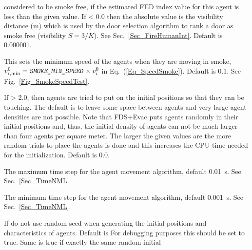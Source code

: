 \documentclass[12pt,a4paper,final,twoside]{stylevk}
\begin{document}
\begin{description}
  considered to be smoke free, if the estimated FED index value for
  this agent is less than the given value.  If < 0.0 then the absolute
  value is the visibility distance (m) which is used by the door
  selection algorithm to rank a door as smoke free (visibility $S =
  3/K$). See Sec.~\ref{Sec_FireHumanInt}.  Default is 0.000001.
%
\item[\Timts{SMOKE\_MIN\_SPEED}] This sets the minimum speed of the
  agents when they are moving in smoke, $v^0_{i,\mathrm{min}} =
  \textnormal{\texttt{\textsl{SMOKE\_MIN\_SPEED}}} \times v^0_i$ in Eq.~(\ref{Eq_SpeedSmoke}).
  Default is 0.1.  See Fig.~\ref{Fig_SmokeSpeedTest}.
%
%
\item[\Timts{DENS\_INIT}] If > 2.0, then agents are tried to put on
  the initial positions so that they can be touching.  The default is
  to leave some space between agents and very large agent densities
  are not possible.  Note that FDS+Evac puts agents randomly in their
  initial positions and, thus, the initial density of agents can not
  be much larger than four agents per square meter.  The larger the
  given values are the more random trials to place the agents is done
  and this increases the CPU time needed for the initialization.
  Default is 0.0.
%
\item[\Timts{EVAC\_DT\_MAX}] The maximum time step for the agent
  movement algorithm, default 0.01~s.  See Sec.~\ref{Sec_TimeNML}.
%
\item[\Timts{EVAC\_DT\_MIN}] The minimum time step for the agent
  movement algorithm, default 0.001~s.  See Sec.~\ref{Sec_TimeNML}.
%
\item[\Timts{NOT\_RANDOM}] If  do not use random seed
  when generating the initial positions and characteristics of agents.
  Default is   For debugging purposes this should be
  set to true.  Same is true if exactly the same random initial

\end{description}
\end{document}
